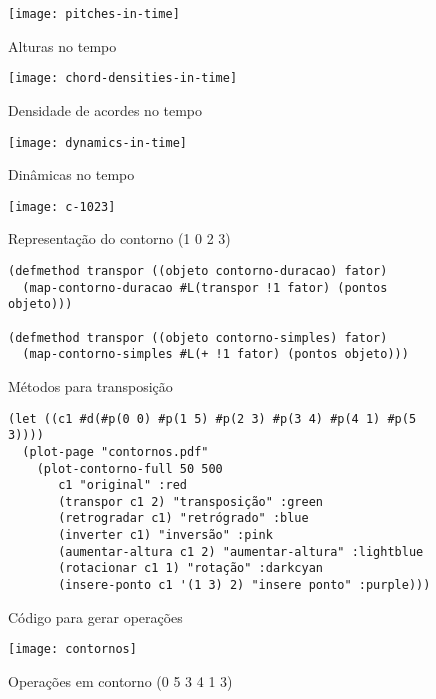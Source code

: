 \documentclass{sciposter}
\begin{document}
\begin{center}

\begin{multicols}{2}

  \begin{figure}
    \centering
    \texttt{[image: pitches-in-time]}
    \caption{Alturas no tempo}
    \label{fig:pitches-in-time}
  \end{figure}

  \begin{figure}
    \centering
    \texttt{[image: chord-densities-in-time]}
    \caption{Densidade de acordes no tempo}
    \label{fig:chord-densities-in-time}
  \end{figure}

  \begin{figure}
    \centering
    \texttt{[image: dynamics-in-time]}
    \caption{Dinâmicas no tempo}
    \label{fig:dynamics-in-time}
  \end{figure}

  \begin{figure}
    \centering
    \texttt{[image: c-1023]}
    \caption{Representação do contorno (1 0 2 3)}
    \label{fig:repr-1023}
  \end{figure}

\begin{figure}
  \centering
\begin{verbatim}
(defmethod transpor ((objeto contorno-duracao) fator)
  (map-contorno-duracao #L(transpor !1 fator) (pontos objeto)))

(defmethod transpor ((objeto contorno-simples) fator)
  (map-contorno-simples #L(+ !1 fator) (pontos objeto)))
\end{verbatim}
  \label{fig:metodos}
  \caption{Métodos para transposição}
\end{figure}

\begin{figure}
  \centering
\begin{verbatim}
(let ((c1 #d(#p(0 0) #p(1 5) #p(2 3) #p(3 4) #p(4 1) #p(5 3))))
  (plot-page "contornos.pdf"
    (plot-contorno-full 50 500
       c1 "original" :red
       (transpor c1 2) "transposição" :green
       (retrogradar c1) "retrógrado" :blue
       (inverter c1) "inversão" :pink
       (aumentar-altura c1 2) "aumentar-altura" :lightblue
       (rotacionar c1 1) "rotação" :darkcyan
       (insere-ponto c1 '(1 3) 2) "insere ponto" :purple)))
\end{verbatim}
  \label{fig:gera-operacoes}
  \caption{Código para gerar operações}
\end{figure}

\begin{figure}
  \centering
  \texttt{[image: contornos]}
  \caption{Operações em contorno (0 5 3 4 1 3)}
  \label{fig:operacoes}
\end{figure}

\end{multicols}

\end{center}
\end{document}
